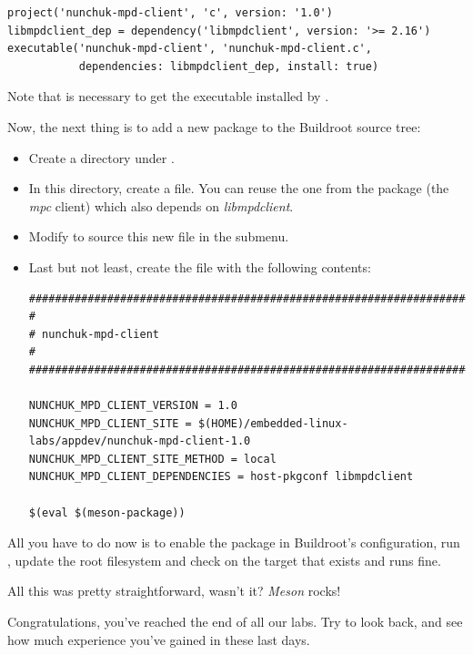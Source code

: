 \begin{verbatim}
project('nunchuk-mpd-client', 'c', version: '1.0')
libmpdclient_dep = dependency('libmpdclient', version: '>= 2.16')
executable('nunchuk-mpd-client', 'nunchuk-mpd-client.c',
           dependencies: libmpdclient_dep, install: true)
\end{verbatim}

Note that  is necessary to get the executable installed
by .

Now, the next thing is to add a new package to the Buildroot source
tree:
\begin{itemize}
\item Create a  directory under .
\item In this directory, create a  file. You can reuse
      the one from the  package (the {\em mpc} client)
      which also depends on {\em libmpdclient}.
\item Modify  to source this new file in the
       submenu.
\item Last but not least, create the  file
      with the following contents:
\begin{verbatim}
################################################################################
#
# nunchuk-mpd-client
#
################################################################################

NUNCHUK_MPD_CLIENT_VERSION = 1.0
NUNCHUK_MPD_CLIENT_SITE = $(HOME)/embedded-linux-labs/appdev/nunchuk-mpd-client-1.0
NUNCHUK_MPD_CLIENT_SITE_METHOD = local
NUNCHUK_MPD_CLIENT_DEPENDENCIES = host-pkgconf libmpdclient

$(eval $(meson-package))
\end{verbatim}
\end{itemize}

All you have to do now is to enable the 
package in Buildroot's configuration, run , update the root
filesystem and check on the target that
 exists and runs fine.

All this was pretty straightforward, wasn't it? {\em Meson} rocks!

Congratulations, you've reached the end of all our labs. Try to look
back, and see how much experience you've gained in these last days.
